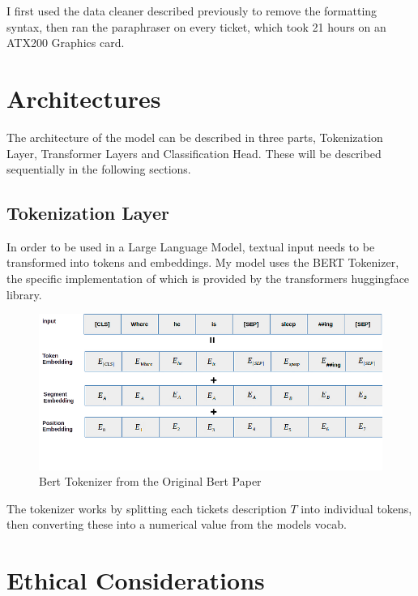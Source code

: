 \documentclass{UoYCSproject}
\begin{document}

I first used the data cleaner described previously to remove the formatting syntax, then ran the paraphraser on every ticket, which took 21 hours on an ATX200 Graphics card.\par

\section{Architectures}\label{sec:architectures}
    The architecture of the model can be described in three parts, Tokenization Layer, Transformer Layers and Classification Head.
    These will be described sequentially in the following sections.\par

\subsection[tokenization-layer]{Tokenization Layer}
    In order to be used in a Large Language Model, textual input needs to be transformed into tokens and embeddings.
    My model uses the BERT Tokenizer, the specific implementation of which is provided by the transformers huggingface library. \par

    \begin{figure}[h]
\includegraphics[width=\textwidth]{bert-tokenizer}
\caption{Bert Tokenizer from the Original Bert Paper}
\label{fig:tokenizer-figure}
\end{figure}

    The tokenizer works by splitting each tickets description $T$ into individual tokens, then converting these into a numerical value from the models vocab.


\section{Ethical Considerations}\label{sec:ethical-considerations}
\end{document}
